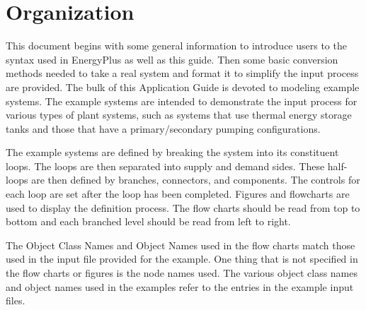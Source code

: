 \section{Organization}\label{organization}

This document begins with some general information to introduce users to the syntax used in EnergyPlus as well as this guide. Then some basic conversion methods needed to take a real system and format it to simplify the input process are provided. The bulk of this Application Guide is devoted to modeling example systems. The example systems are intended to demonstrate the input process for various types of plant systems, such as systems that use thermal energy storage tanks and those that have a primary/secondary pumping configurations.

The example systems are defined by breaking the system into its constituent loops. The loops are then separated into supply and demand sides. These half-loops are then defined by branches, connectors, and components. The controls for each loop are set after the loop has been completed. Figures and flowcharts are used to display the definition process. The flow charts should be read from top to bottom and each branched level should be read from left to right.

The Object Class Names and Object Names used in the flow charts match those used in the input file provided for the example. One thing that is not specified in the flow charts or figures is the node names used. The various object class names and object names used in the examples refer to the entries in the example input files.
